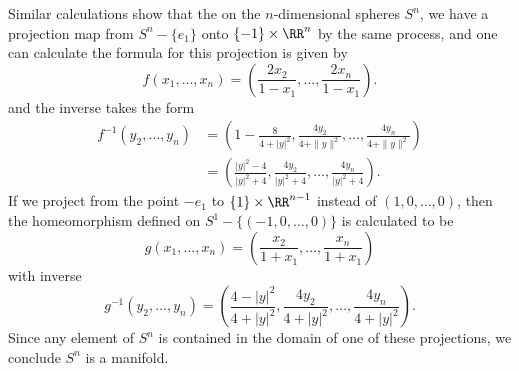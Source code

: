 \begin{example}
%
%
%
%
%
    Similar calculations show that the on the $n$-dimensional spheres $S^n$, we have a projection map from $S^n - \{ e_1 \}$ onto $\{ -1 \} \times \RR^n$ by the same process, and one can calculate the formula for this projection is given by
    \[ f(x_1, \dots, x_n) = \left( \frac{2x_2}{1 - x_1}, \dots, \frac{2x_n}{1 - x_1} \right). \]
    and the inverse takes the form
    \begin{align*}
        f^{-1}(y_2, \dots, y_n) &= \left(1 - \frac{8}{4 + |y|^2}, \frac{4y_2}{4 + \| y \|^2}, \dots, \frac{4y_n}{4 + \| y \|^2} \right)\\
        &= \left( \frac{|y|^2 - 4}{|y|^2 + 4}, \frac{4y_2}{|y|^2 + 4}, \dots, \frac{4y_n}{|y|^2 + 4} \right).
    \end{align*}
    If we project from the point $-e_1$ to $\{ 1 \} \times \RR^{n-1}$ instead of $(1,0,\dots,0)$, then the homeomorphism defined on $S^1 - \{ (-1,0,\dots,0) \}$ is calculated to be
    \[ g(x_1, \dots, x_n) = \left( \frac{x_2}{1 + x_1}, \dots, \frac{x_n}{1 + x_1} \right) \]
    with inverse
    \[ g^{-1}(y_2, \dots, y_n) = \left( \frac{4 - |y|^2}{4 + |y|^2}, \frac{4y_2}{4 + |y|^2}, \dots, \frac{4y_n}{4 + |y|^2} \right). \]
    Since any element of $S^n$ is contained in the domain of one of these projections, we conclude $S^n$ is a manifold.
\end{example}

